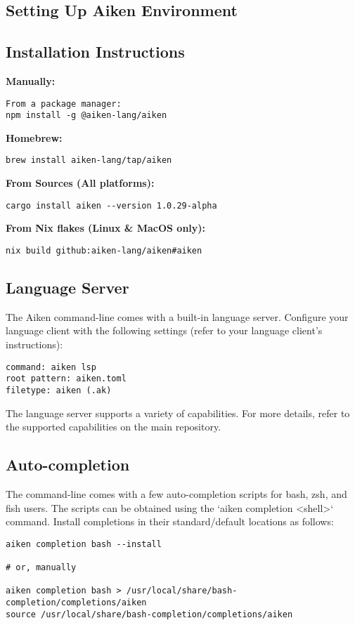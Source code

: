 \subsection{Setting Up Aiken Environment}

\subsection{Installation Instructions}
\textbf{Manually:}
\begin{verbatim}
From a package manager:
npm install -g @aiken-lang/aiken
\end{verbatim}

\textbf{Homebrew:}
\begin{verbatim}
brew install aiken-lang/tap/aiken
\end{verbatim}

\textbf{From Sources (All platforms):}
\begin{verbatim}
cargo install aiken --version 1.0.29-alpha
\end{verbatim}

\textbf{From Nix flakes (Linux \& MacOS only):}
\begin{verbatim}
nix build github:aiken-lang/aiken#aiken
\end{verbatim}

\subsection{Language Server}
The Aiken command-line comes with a built-in language server. Configure your language client with the following settings (refer to your language client's instructions):
\begin{verbatim}
command: aiken lsp
root pattern: aiken.toml
filetype: aiken (.ak)
\end{verbatim}
The language server supports a variety of capabilities. For more details, refer to the supported capabilities on the main repository.

\subsection{Auto-completion}
The command-line comes with a few auto-completion scripts for bash, zsh, and fish users. The scripts can be obtained using the `aiken completion <shell>` command. Install completions in their standard/default locations as follows:
\begin{verbatim}
aiken completion bash --install

# or, manually

aiken completion bash > /usr/local/share/bash-completion/completions/aiken
source /usr/local/share/bash-completion/completions/aiken
\end{verbatim}

